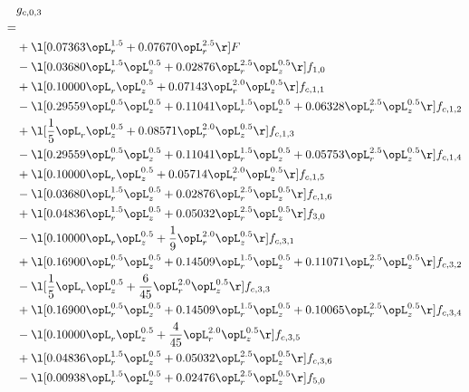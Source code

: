 \begin{alignat}{2} 
\label{eq:g_03_0} 
& g_{c,0,3} \nonumber \\ 
 = \\ 
& + \l[  0.07363 \opL_r^{1.5} +  0.07670 \opL_r^{2.5}  \r] F \nonumber \\ 
& - \l[  0.03680 \opL_r^{1.5} \opL_z^{0.5} +  0.02876 \opL_r^{2.5} \opL_z^{0.5}  \r] f_{1,0} \nonumber \\ 
& + \l[  0.10000 \opL_r \opL_z^{0.5} +  0.07143 \opL_r^{2.0} \opL_z^{0.5}  \r] f_{c,1,1} \nonumber \\ 
& - \l[  0.29559 \opL_r^{0.5} \opL_z^{0.5} +  0.11041 \opL_r^{1.5} \opL_z^{0.5} +  0.06328 \opL_r^{2.5} \opL_z^{0.5}  \r] f_{c,1,2} \nonumber \\ 
& + \l[ \frac{1}{5} \opL_r \opL_z^{0.5} +  0.08571 \opL_r^{2.0} \opL_z^{0.5}  \r] f_{c,1,3} \nonumber \\ 
& - \l[  0.29559 \opL_r^{0.5} \opL_z^{0.5} +  0.11041 \opL_r^{1.5} \opL_z^{0.5} +  0.05753 \opL_r^{2.5} \opL_z^{0.5}  \r] f_{c,1,4} \nonumber \\ 
& + \l[  0.10000 \opL_r \opL_z^{0.5} +  0.05714 \opL_r^{2.0} \opL_z^{0.5}  \r] f_{c,1,5} \nonumber \\ 
& - \l[  0.03680 \opL_r^{1.5} \opL_z^{0.5} +  0.02876 \opL_r^{2.5} \opL_z^{0.5}  \r] f_{c,1,6} \nonumber \\ 
& + \l[  0.04836 \opL_r^{1.5} \opL_z^{0.5} +  0.05032 \opL_r^{2.5} \opL_z^{0.5}  \r] f_{3,0} \nonumber \\ 
& - \l[  0.10000 \opL_r \opL_z^{0.5} + \frac{1}{9} \opL_r^{2.0} \opL_z^{0.5}  \r] f_{c,3,1} \nonumber \\ 
& + \l[  0.16900 \opL_r^{0.5} \opL_z^{0.5} +  0.14509 \opL_r^{1.5} \opL_z^{0.5} +  0.11071 \opL_r^{2.5} \opL_z^{0.5}  \r] f_{c,3,2} \nonumber \\ 
& - \l[ \frac{1}{5} \opL_r \opL_z^{0.5} + \frac{6}{45} \opL_r^{2.0} \opL_z^{0.5}  \r] f_{c,3,3} \nonumber \\ 
& + \l[  0.16900 \opL_r^{0.5} \opL_z^{0.5} +  0.14509 \opL_r^{1.5} \opL_z^{0.5} +  0.10065 \opL_r^{2.5} \opL_z^{0.5}  \r] f_{c,3,4} \nonumber \\ 
& - \l[  0.10000 \opL_r \opL_z^{0.5} + \frac{4}{45} \opL_r^{2.0} \opL_z^{0.5}  \r] f_{c,3,5} \nonumber \\ 
& + \l[  0.04836 \opL_r^{1.5} \opL_z^{0.5} +  0.05032 \opL_r^{2.5} \opL_z^{0.5}  \r] f_{c,3,6} \nonumber \\ 
& - \l[  0.00938 \opL_r^{1.5} \opL_z^{0.5} +  0.02476 \opL_r^{2.5} \opL_z^{0.5}  \r] f_{5,0} \nonumber \\ 

\end{alignat}
